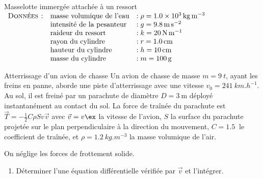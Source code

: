 \begin{exo}[MPSI]{Masselotte immergée attachée à un ressort}
$\begin{array}{lll}
\textsc{Données :}  & \text{masse volumique de l'eau} & : \rho=\SI{1.0e3}{kg.m^{-3}} \\
& \text{intensité de la pesanteur} & : g=\SI{9.8}{m.s^{-2}} \\
& \text{raideur du ressort} & : k=\SI{20}{N.m^{-1}} \\
& \text{rayon du cylindre } & : r=\SI{1.0}{cm} \\
& \text{hauteur du cylindre} & : h=\SI{10}{cm} \\
& \text{masse du cylindre} & : m=\SI{100}{g}
\end{array}
$
\end{exo}

\begin{exo}[MPSI]{Atterrissage d'un avion de chasse}
 Un avion de chasse de masse $m=\SI{9}{t}$, ayant les freins en panne, aborde une piste d'atterrissage avec une vitesse $v_{0}=\SI{241}{km.h^{-1}}$. Au sol,
 il est freiné par un parachute de diamètre $D=3\:\mathrm{m}$ déployé instantanément au contact du sol. La force de traînée
 du parachute est $\Vec{T} = - \textstyle\frac{1}{2}C\rho Sv \Vec{v}$ avec $\Vec{v}=v\ex$ la vitesse de l'avion, $S$ la surface du parachute projetée sur le plan perpendiculaire à la direction du mouvement, $C=\SI{1.5}{}$ le
 coefficient de traînée, et $\rho=\SI{1.2}{kg.m^{-3}}$ la masse volumique de l'air.
 \begin{quest}
  \item  On néglige les forces de frottement solide.
	\begin{enumerate}
	 \item Déterminer l'une équation différentielle vérifiée par $\Vec{v}$ et l'intégrer.

\end{enumerate}
\end{quest}
\end{exo}
